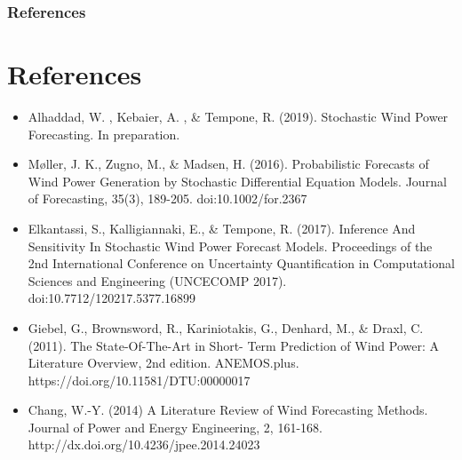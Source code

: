 \documentclass[aspectratio=169]{beamer}\usepackage[utf8]{inputenc}
\begin{document}
\begin{frame}\frametitle{References}


\section*{References}
\begin{flushleft}
\begin{itemize}
\item Alhaddad, W. ,  Kebaier, A. , \& Tempone, R. (2019). Stochastic Wind Power Forecasting. In preparation.
\item  M\o ller, J. K., Zugno, M., \& Madsen, H. (2016). Probabilistic Forecasts of Wind Power Generation by Stochastic Differential Equation Models. Journal of Forecasting, 35(3), 189-205. doi:10.1002/for.2367 
\item  Elkantassi, S., Kalligiannaki, E., \& Tempone, R. (2017). Inference And Sensitivity In Stochastic Wind Power Forecast Models. Proceedings of the 2nd International Conference on Uncertainty Quantification in Computational Sciences and Engineering (UNCECOMP 2017). doi:10.7712/120217.5377.16899
\item Giebel, G., Brownsword, R., Kariniotakis, G., Denhard, M., \& Draxl, C. (2011). The State-Of-The-Art in Short- Term Prediction of Wind Power: A Literature Overview, 2nd edition. ANEMOS.plus. https://doi.org/10.11581/DTU:00000017 
\item Chang, W.-Y. (2014) A Literature Review of Wind Forecasting Methods. Journal of Power and Energy Engineering, 2, 161-168. http://dx.doi.org/10.4236/jpee.2014.24023
\end{itemize}
\end{flushleft} 

\end{frame}
\end{document}
